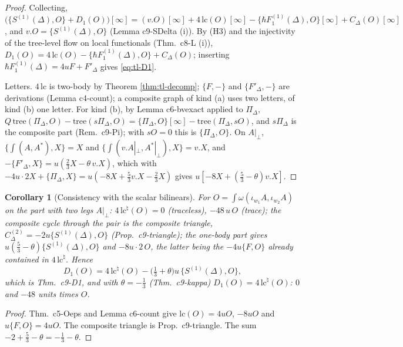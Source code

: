 \documentclass[11pt]{article}
\numberwithin{equation}{section}
\theoremstyle{plain}
\newtheorem{corollary}[theorem]{Corollary}
\theoremstyle{definition}
\begin{document}
\begin{proof}
Collecting, $\big(\{S^{(1)}(\Delta),O\}+D_1(O)\big)[\infty]=(v.O)[\infty]+4\,\mathrm{lc}(O)[\infty]-\{\hbar F_1^{(1)}(\Delta),O\}[\infty]+C_\Delta(O)[\infty]$, and $v.O=\{S^{(1)}(\Delta),O\}$ (Lemma c9-SDelta (i)). By (H3) and the injectivity of the tree-level flow on local functionals (Thm.~c8-L (i)), $D_1(O)=4\,\mathrm{lc}(O)-\{\hbar F_1^{(1)}(\Delta),O\}+C_\Delta(O)$; inserting $\hbar F_1^{(1)}(\Delta)=4uF+F'_\Delta$ gives \eqref{eq:tl-D1}.

Letters. $4\,\mathrm{lc}$ is two-body by Theorem \ref{thm:tl-decomp}; $\{F,-\}$ and $\{F'_\Delta,-\}$ are derivations (Lemma c4-count); a composite graph of kind (a) uses two letters, of kind (b) one letter. For kind (b), by Lemma c6-bvexact applied to $\Pi_\Delta$, $Q\,\mathrm{tree}(\Pi_\Delta,O)-\mathrm{tree}(s\Pi_\Delta,O)=\{\Pi_\Delta,O\}[\infty]-\mathrm{tree}(\Pi_\Delta,sO)$, and $s\Pi_\Delta$ is the composite part (Rem.~c9-Pi); with $sO=0$ this is $\{\Pi_\Delta,O\}$. On $A|_\perp$, $\{\int(A,A^*),X\}=X$ and $\{\int(v.A|_\perp,A^*|_\perp),X\}=v.X$, and $-\{F'_\Delta,X\}=u(\tfrac23X-\theta\,v.X)$, which with $-4u\cdot2X+\{\Pi_\Delta,X\}=u(-8X+\tfrac53v.X-\tfrac23X)$ gives $u[-8X+(\tfrac53-\theta)v.X]$.
\end{proof}

\begin{corollary}[Consistency with the scalar bilinears]
\label{cor:tl-D1bil}
For $O=\int\omega(\iota_{w_1}A,\iota_{w_2}A)$ on the part with two legs $A|_\perp$: $4\,\mathrm{lc}^\natural(O)=0$ (traceless), $-48\,u\,O$ (trace); the composite cycle through the pair is the composite triangle, $C^{(2)}_\Delta=-2u\{S^{(1)}(\Delta),O\}$ (Prop.~c9-triangle); the one-body part gives $u(\tfrac53-\theta)\{S^{(1)}(\Delta),O\}$ and $-8u\cdot2\,O$, the latter being the $-4u\{F,O\}$ already contained in $4\,\mathrm{lc}^\natural$. Hence
\[
D_1(O)=4\,\mathrm{lc}^\natural(O)-\big(\tfrac13+\theta\big)u\,\{S^{(1)}(\Delta),O\},
\]
which is Thm.~c9-D1, and with $\theta=-\tfrac13$ (Thm.~c9-kappa) $D_1(O)=4\,\mathrm{lc}^\natural(O)$: $0$ and $-48$ units times $O$.
\end{corollary}

\begin{proof}
Thm.~c5-Oeps and Lemma c6-count give $\mathrm{lc}(O)=4uO$, $-8uO$ and $u\{F,O\}=4uO$. The composite triangle is Prop.~c9-triangle. The sum $-2+\tfrac53-\theta=-\tfrac13-\theta$.
\end{proof}
\end{document}
